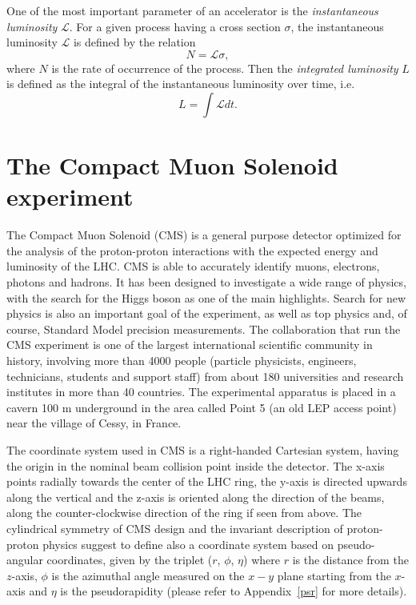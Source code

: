 One of the most important parameter of an accelerator is the
{\em instantaneous luminosity} $\mathcal{L}$. For a given process having a cross section $\sigma$, the
instantaneous luminosity $\mathcal{L}$ is defined by the relation
\begin{equation}
N= \mathcal{L} \sigma, \end{equation}
where $N$ is the rate of occurrence of the process. Then the {\em
  integrated luminosity} $L$ is defined as the integral of the
instantaneous luminosity over time, i.e.
\begin{equation}
L=\int \mathcal{L}  dt.
\end{equation}

\section{The Compact Muon Solenoid experiment}
The Compact Muon Solenoid (CMS)  is a general purpose detector
optimized for the analysis of the 
proton-proton interactions with the expected energy and luminosity of
the LHC. CMS is able to accurately identify muons, electrons, photons
and hadrons. It
has been designed to investigate a wide range of physics, with the search for the Higgs
boson as one of the main highlights. Search for new physics is also an important goal of the
experiment, as well as top physics and, of course, Standard Model precision measurements.
The collaboration that run the CMS experiment is one
of the largest international scientific community in history, involving more than 4000
people (particle physicists, engineers, technicians, students and support staff) from about
180 universities and research institutes in more than 40 countries.
The experimental apparatus is placed in a cavern 100 m underground in
the area called Point 5 (an old LEP access point) near the village of
Cessy, in France. 

The coordinate system used in CMS is a right-handed Cartesian system, having the origin
in the nominal beam collision point inside the detector. The x-axis points radially towards
the center of the LHC ring, the y-axis is directed upwards along the vertical and the z-axis 
is oriented along the direction of the beams, along the counter-clockwise direction of
the ring if seen from above. The cylindrical symmetry of CMS design and the invariant
description of proton-proton physics suggest to define also a coordinate system based on
pseudo-angular coordinates, given by the triplet ($r$, $\phi$, $\eta$) where $r$ is the distance from
the $z$-axis, $\phi$ is the azimuthal angle measured on the $x-y$ plane starting from the $x$-axis
and $\eta$ is the pseudorapidity (please refer to Appendix~\ref{psr}
for more details).

